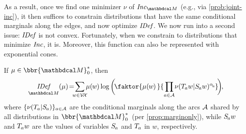 \documentclass[twoside]{article}
\begin{document}
As a result, once we find one minimizer $\nu$ of $\Inc_{\dg M}$
(e.g., via \eqref{prob:joint-inc}),
it then suffices to constrain distributions that have the same conditional marginals along the edges, and now optimize $\mathit{IDef}_{\!}$.
We now run into a second issue: $\mathit{IDef}_{\!}$ is not convex.
Fortunately, when we constrain to distributions that minimize $\mathit{Inc}$, it is.
Moreover, this function can also be represented with exponential cones.

\begin{prop}\label{prop:idef-frozen}
If $\mu \in \bbr{\dg M}_0^*$,
then
\vspace{-1ex}
\begin{equation}
    \underset{{\dg M}}{\IDef{}}(\mu) \!=\!
        \sum_{\mathclap{ w \in \V\!\X } }
            \mu(\mskip-1mu w \mskip-1mu)
            \log  \bigg(\!
                \faktor{\mu(\mskip-1mu w\mskip-1mu )\,}{\,\prod_{\mathclap{a \in \Ar}} \nu(\Tgt aw | \Src aw)^
                {\alpha\ssub a}
                }\!
            \bigg)\mskip-2mu
        ,
        \label{eq:idef-alt-constr}
\end{equation}
%
where $\{ \nu(\Tgt a | \Src a ) \}_{a \in \Ar}$ are the
conditional marginals along the arcs $\mathcal A$
shared by all distributions in $\bbr{\dg M}^*_0$\
(per \cref{prop:marginonly}),
while $\Src a w$ and $\Tgt a w$ are the
values of variables
$\Src a$ and $\Tgt a$
in $w$,
respectively.
\end{prop}
\end{document}
